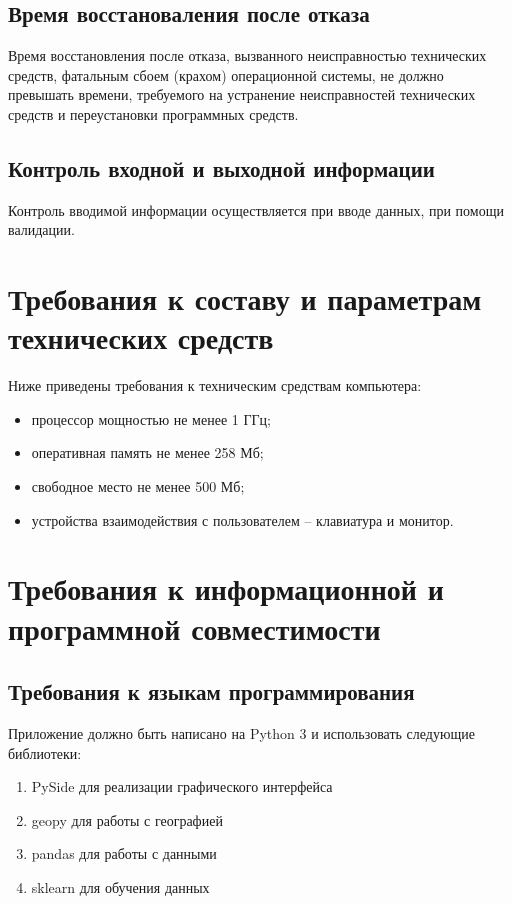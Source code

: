 \documentclass[a4paper,english]{G2-105}
\begin{document}
		\subsection{Время восстановаления после отказа}
			\par Время восстановления после отказа, вызванного неисправностью технических средств, фатальным сбоем (крахом) операционной системы, не должно превышать времени, требуемого на устранение неисправностей технических средств и переустановки программных средств.
		\subsection{Контроль входной и выходной информации}
			\par Контроль вводимой информации осуществляется при вводе данных, при помощи валидации.
			
	\section{Требования к составу и параметрам технических средств}
		\par Ниже приведены требования к техническим средствам компьютера:
		\begin{itemize}
			\item процессор мощностью не менее 1 ГГц;
			\item оперативная память не менее 258 Мб;
			\item свободное место не менее 500 Мб;
			\item устройства взаимодействия с пользователем – клавиатура и монитор.
		\end{itemize}
		
	\section{Требования к информационной и программной совместимости}
		\subsection {Требования к языкам программирования}
			\par Приложение должно быть написано на Python 3 и использовать следующие библиотеки:
				\begin{enumerate}
					\item  PySide для реализации графического интерфейса
					\item  geopy для работы с географией
					\item  pandas для работы с данными
					\item  sklearn для обучения данных
				\end{enumerate}
\end{document}
